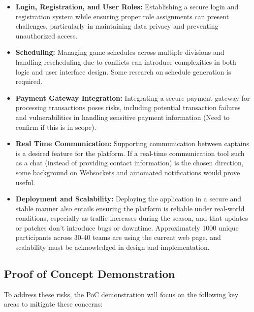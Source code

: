 \documentclass{article}
\begin{document}
\begin{itemize}
  \item \textbf{Login, Registration, and User Roles:} Establishing a secure login and registration system while ensuring proper role assignments can present challenges, particularly in maintaining data privacy and preventing unauthorized access.
  \item \textbf{Scheduling:} Managing game schedules across multiple divisions and handling rescheduling due to conflicts can introduce complexities in both logic and user interface design. Some research on schedule generation is required.
  \item \textbf{Payment Gateway Integration:} Integrating a secure payment gateway for processing transactions poses risks, including potential transaction failures and vulnerabilities in handling sensitive payment information (Need to confirm if this is in scope).
  \item \textbf{Real Time Communication:} Supporting communication between captains is a desired feature for the platform. If a real-time communication tool such as a chat (instead of providing contact information) is the chosen direction, some background on Websockets and automated notifications would prove useful.
  \item \textbf{Deployment and Scalability:} Deploying the application in a secure and stable manner also entails ensuring the platform is reliable under real-world conditions, especially as traffic increases during the season, and that updates or patches don’t introduce bugs or downtime. Approximately 1000 unique participants across 30-40 teams are using the current web page, and scalability must be acknowledged in design and implementation.
\end{itemize}
\subsection{Proof of Concept Demonstration}

To address these risks, the PoC demonstration will focus on the following key areas to mitigate these concerns:
\end{document}
